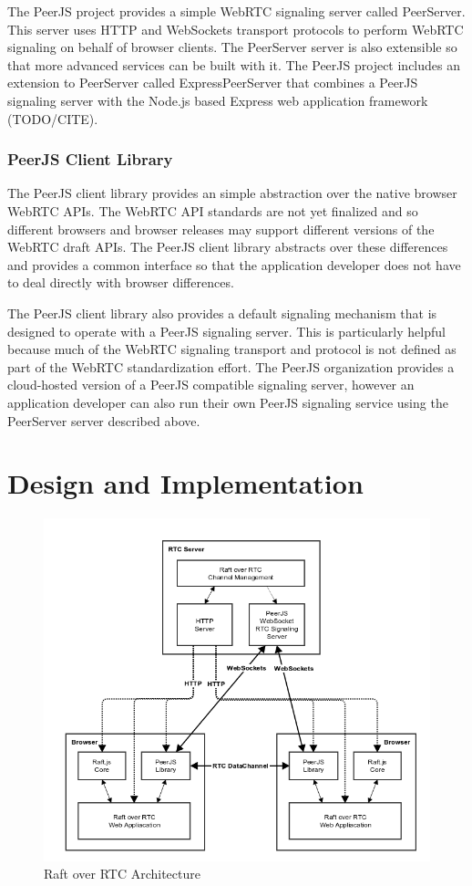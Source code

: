 \documentclass{acmtog} %
\begin{document}
The PeerJS project provides a simple WebRTC signaling server called
PeerServer. This server uses HTTP and WebSockets transport protocols
to perform WebRTC signaling on behalf of browser clients. The
PeerServer server is also extensible so that more advanced services
can be built with it. The PeerJS project includes an extension to
PeerServer called ExpressPeerServer that combines a PeerJS signaling
server with the Node.js based Express web application framework
(TODO/CITE).

\subsubsection{PeerJS Client Library}

The PeerJS client library provides an simple abstraction over the
native browser WebRTC APIs. The WebRTC API standards are not yet
finalized and so different browsers and browser releases may support
different versions of the WebRTC draft APIs. The PeerJS client library
abstracts over these differences and provides a common interface so
that the application developer does not have to deal directly with
browser differences.

The PeerJS client library also provides a default signaling mechanism
that is designed to operate with a PeerJS signaling server. This is
particularly helpful because much of the WebRTC signaling transport
and protocol is not defined as part of the WebRTC standardization
effort. The PeerJS organization provides a cloud-hosted version of
a PeerJS compatible signaling server, however an application developer
can also run their own PeerJS signaling service using the PeerServer
server described above.

\section {Design and Implementation}

\begin{figure}[Ht]
\centerline{\includegraphics[width=15cm]{raft_rtc_architecture}}
\caption{Raft over RTC Architecture}
  \label{fig:raft_rtc_architecture}
\end{figure}
\end{document}
